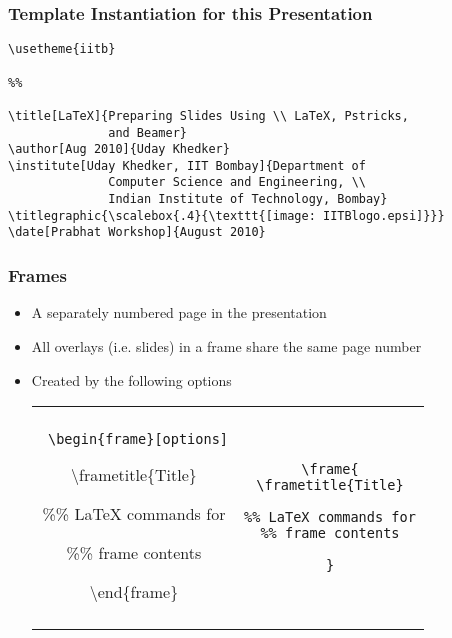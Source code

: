 \documentclass[handout]{beamer}
\begin{document}
\begin{frame}[fragile]
\frametitle{Template Instantiation for this Presentation}

\begin{verbatim}
\usetheme{iitb}

%%

\title[LaTeX]{Preparing Slides Using \\ LaTeX, Pstricks, 
              and Beamer}
\author[Aug 2010]{Uday Khedker}
\institute[Uday Khedker, IIT Bombay]{Department of 
              Computer Science and Engineering, \\ 
              Indian Institute of Technology, Bombay}
\titlegraphic{\scalebox{.4}{\texttt{[image: IITBlogo.epsi]}}}
\date[Prabhat Workshop]{August 2010}
\end{verbatim}
\end{frame}

\begin{frame}[fragile]
\frametitle{Frames}

\begin{itemize}
\item A separately numbered page in the presentation
\item All overlays (i.e. slides) in a frame share the same page number
\item Created by the following options

\bigskip

\begin{center}
\begin{tabular}{|c|c|}
\hline
&
\\
\begin{minipage}{45mm}
\tt
\textbackslash begin\{frame\}[options]

\textbackslash frametitle\{Title\}

\bigskip

\%\% LaTeX commands for 

\%\% frame contents

\bigskip

\textbackslash end\{frame\}
\end{minipage}
&
\begin{minipage}{45mm}
\begin{verbatim}
\frame{
\frametitle{Title}

%% LaTeX commands for
%% frame contents

}
\end{verbatim}
\end{minipage}
\\
&
\\ \hline
\end{tabular}
\end{center}

\end{itemize}
\end{frame}
\end{document}
